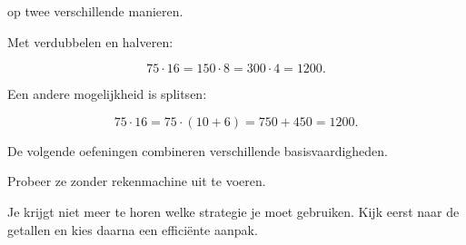 \documentclass{ximera}
\begin{document}
\begin{oefening}{\oefG}
\begin{question}
op twee verschillende manieren.

\begin{oplossing}

Met verdubbelen en halveren:

\[
75\cdot16
=
150\cdot8
=
300\cdot4
=
1200.
\]

Een andere mogelijkheid is splitsen:

\[
75\cdot16
=
75\cdot(10+6)
=
750+450
=
1200.
\]

\end{oplossing}

\end{question}

\end{oefening}



De volgende oefeningen combineren verschillende basisvaardigheden.

Probeer ze zonder rekenmachine uit te voeren.

Je krijgt niet meer te horen welke strategie je moet gebruiken.
Kijk eerst naar de getallen en kies daarna een efficiënte aanpak.
\end{document}

